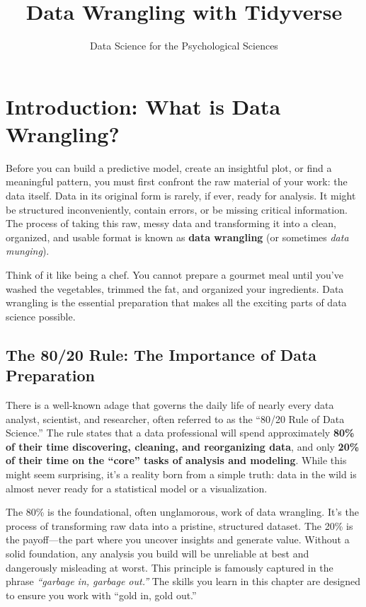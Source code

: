 \documentclass[
  11pt,
]{article}
\title{Data Wrangling with Tidyverse}
\author{Data Science for the Psychological Sciences}
\date{}
\begin{document}
\maketitle

\section{Introduction: What is Data
Wrangling?}\label{introduction-what-is-data-wrangling}

Before you can build a predictive model, create an insightful plot, or
find a meaningful pattern, you must first confront the raw material of
your work: the data itself. Data in its original form is rarely, if
ever, ready for analysis. It might be structured inconveniently, contain
errors, or be missing critical information. The process of taking this
raw, messy data and transforming it into a clean, organized, and usable
format is known as \textbf{data wrangling} (or sometimes \emph{data
munging}).

Think of it like being a chef. You cannot prepare a gourmet meal until
you've washed the vegetables, trimmed the fat, and organized your
ingredients. Data wrangling is the essential preparation that makes all
the exciting parts of data science possible.

\subsection{The 80/20 Rule: The Importance of Data
Preparation}\label{the-8020-rule-the-importance-of-data-preparation}

There is a well-known adage that governs the daily life of nearly every
data analyst, scientist, and researcher, often referred to as the
``80/20 Rule of Data Science.'' The rule states that a data professional
will spend approximately \textbf{80\% of their time discovering,
cleaning, and reorganizing data}, and only \textbf{20\% of their time on
the ``core'' tasks of analysis and modeling}. While this might seem
surprising, it's a reality born from a simple truth: data in the wild is
almost never ready for a statistical model or a visualization.

The 80\% is the foundational, often unglamorous, work of data wrangling.
It's the process of transforming raw data into a pristine, structured
dataset. The 20\% is the payoff---the part where you uncover insights
and generate value. Without a solid foundation, any analysis you build
will be unreliable at best and dangerously misleading at worst. This
principle is famously captured in the phrase \emph{``garbage in, garbage
out.''} The skills you learn in this chapter are designed to ensure you
work with ``gold in, gold out.''
\end{document}
